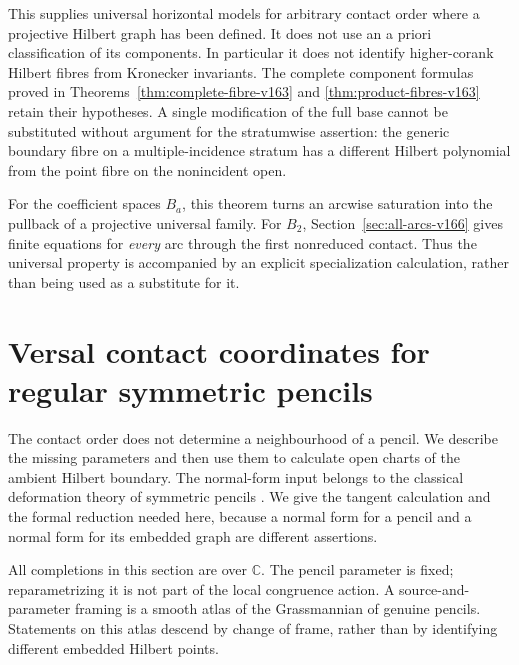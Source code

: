 \documentclass[11pt,reqno]{amsart}
\numberwithin{equation}{section}
\theoremstyle{definition}\newtheorem{definition}[theorem]{Definition}
\theoremstyle{remark}\newtheorem{remark}[theorem]{Remark}
\newcommand{\C}{\mathbb C}\newcommand{\Q}{\mathbb Q}
\begin{document}
This supplies universal horizontal models for arbitrary contact order
where a projective Hilbert graph has been defined. It does not use
an a priori classification of its components. In particular it does
not identify higher-corank Hilbert fibres from Kronecker invariants.
The complete component formulas proved in
Theorems~\ref{thm:complete-fibre-v163} and
\ref{thm:product-fibres-v163} retain their hypotheses. A single
modification of the full base cannot be substituted without argument
for the stratumwise assertion: the generic boundary fibre on a
multiple-incidence stratum has a different Hilbert polynomial from
the point fibre on the nonincident open.

For the coefficient spaces $B_a$, this theorem turns an arcwise
saturation into the pullback of a projective universal family. For
$B_2$, Section~\ref{sec:all-arcs-v166} gives finite equations for \emph{every} arc
through the first nonreduced contact. Thus the universal property is
accompanied by an explicit specialization calculation, rather than
being used as a substitute for it.

\section{Versal contact coordinates for regular symmetric pencils}
\label{sec:versal-contacts-v162}
The contact order does not determine a neighbourhood of a pencil.
We describe the missing parameters and then use them to calculate
open charts of the ambient Hilbert boundary. The normal-form input
belongs to the classical deformation theory of symmetric pencils
\cite[Theorem~2.1, Corollary~2.1 and Lemma~3.1]{Dmytryshyn162}.
We give the tangent calculation and the formal reduction needed here,
because a normal form for a pencil and a normal form for its embedded
graph are different assertions.

All completions in this section are over $\C$. The pencil parameter
is fixed; reparametrizing it is not part of the local congruence action.
A source-and-parameter framing is a smooth atlas of the Grassmannian
of genuine pencils. Statements on this atlas descend by change of
frame, rather than by identifying different embedded Hilbert points.
\end{document}
